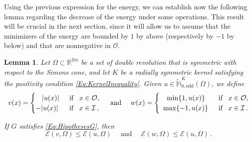\documentclass[12pt,reqno]{amsart}
\newtheorem{lemma}[theorem]{Lemma}
\theoremstyle{definition}
\theoremstyle{remark}
\newcommand{\con}[1]{\mathbb{#1}}
\newcommand{\R}{\con{R}} %
\renewcommand{\H}{\con{H}}
\newcommand{\ecal}{\mathcal{E}}
\newcommand{\ical}{\mathcal{I}}
\newcommand{\ocal}{\mathcal{O}}
\numberwithin{equation}{section}
\begin{document}
	Using the previous expression for the energy, we can establish now the following lemma regarding the decrease of the energy under some operations. This result will be crucial in the next section, since it will allow us to assume that the minimizers of the energy are bounded by $1$ by above (respectively by $-1$ by below) and that are nonnegative in $\ocal$.
	\begin{lemma}
		\label{Lemma:DecreaseEnergy} 
		Let $\Omega\subset \R^{2m}$ be a set of double revolution that is symmetric with respect to the Simons cone, and let $K$ be a radially symmetric kernel satisfying the positivity condition \eqref{Eq:KernelInequality}. Given $u\in\widetilde{\H}^K_{0,\mathrm{odd}}(\Omega)$, we define
		\begin{equation*}
		v(x) = \begin{cases}
		\hspace{3.2mm}|u(x)| \,\,\, &\text{if } \,\,\, x\in\ocal,\\
		-|u(x)| \,\,\, &\text{if } \,\,\, x\in\ical\, ,
		\end{cases}
		\quad 
		\text{ and }
		\quad
		w(x) = \begin{cases}
		\hspace{3.6mm}\min\{1,u(x)\} \,\,\, &\text{if } \,\,\, x\in\ocal,\\
		\,\,\,\max\{-1,u(x)\} \,\,\, &\text{if } \,\,\, x\in\ical\,.
		\end{cases}
		\end{equation*}
		
		If $G$ satisfies \eqref{Eq:HipothesesG}, then
		$$ \ecal(v,\Omega) \leq \ecal(u,\Omega) \quad 
		\text{ and }
		\quad \ecal(w,\Omega) \leq \ecal(u,\Omega) \,.  $$
	\end{lemma}
	
\end{document}
